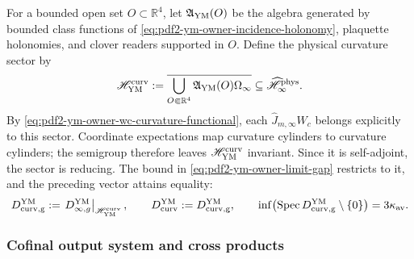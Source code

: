For a bounded open set $O\subset\mathbb R^4$, let
$\mathfrak A_{\rm YM}(O)$ be the algebra generated by bounded class functions of
\eqref{eq:pdf2-ym-owner-incidence-holonomy}, plaquette holonomies, and clover
readers supported in $O$. Define the physical curvature sector by
\begin{equation}\label{eq:pdf2-ym-owner-curvature-cyclic-sector}
 \mathscr H_{\rm YM}^{\rm curv}
 :=\overline{\bigcup_{O\Subset\mathbb R^4}
   \mathfrak A_{\rm YM}(O)\Omega_\infty}
 \subseteq\widehat{\mathscr H}_\infty^{\rm phys}.
\end{equation}
By \eqref{eq:pdf2-ym-owner-wc-curvature-functional}, each
$\widehat J_{m,\infty}W_c$ belongs explicitly to this sector.
Coordinate expectations map curvature cylinders to curvature
cylinders; the semigroup therefore leaves
$\mathscr H_{\rm YM}^{\rm curv}$ invariant. Since it is self-adjoint, the sector is reducing. The
bound in \eqref{eq:pdf2-ym-owner-limit-gap} restricts to it, and the preceding vector
attains equality:
\begin{equation}\label{eq:pdf2-ym-owner-curvature-sector-gap}
 D_{\rm curv,g}^{\rm YM}
 :=\left.D_{\infty,g}^{\rm YM}\right|_{\mathscr H_{\rm YM}^{\rm curv}},
 \qquad D_{\rm curv}^{\rm YM}:=D_{\rm curv,g}^{\rm YM},
 \qquad
 \inf\bigl(\operatorname{Spec}D_{\rm curv,g}^{\rm YM}\setminus\{0\}\bigr)
 =3\kappa_{\rm av}.
\end{equation}

\subsubsection{Cofinal output system and cross products}

